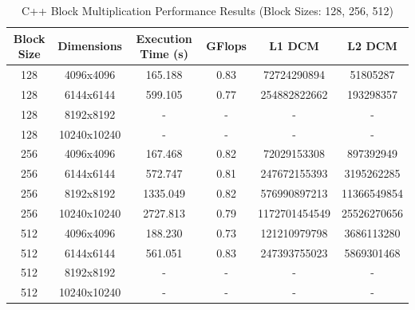 \documentclass{article}
\begin{document}
\begin{table}[H]
\centering
\caption{C++ Block Multiplication Performance Results (Block Sizes: 128, 256, 512)}
\begin{tabular}{||c | c | c | c | c | c||} 
 \hline
 \textbf{Block Size} & \textbf{Dimensions} & \textbf{Execution Time (s)} & \textbf{GFlops} & \textbf{L1 DCM} & \textbf{L2 DCM} \\  
 \hline \hline
 128  & 4096x4096  & 165.188  & 0.83  & 72724290894   & 51805287    \\  
 \hline
 128  & 6144x6144  & 599.105  & 0.77  & 254882822662  & 193298357   \\  
 \hline
 128  & 8192x8192  & -        & -     & -             & -           \\  
 \hline
 128  & 10240x10240 & -       & -     & -             & -           \\  
 \hline \hline
 256  & 4096x4096  & 167.468  & 0.82  & 72029153308   & 897392949   \\  
 \hline
 256  & 6144x6144  & 572.747  & 0.81  & 247672155393  & 3195262285  \\  
 \hline
 256  & 8192x8192  & 1335.049 & 0.82  & 576990897213  & 11366549854 \\  
 \hline
 256  & 10240x10240 & 2727.813 & 0.79  & 1172701454549 & 25526270656 \\  
 \hline \hline
 512  & 4096x4096  & 188.230  & 0.73  & 121210979798  & 3686113280  \\  
 \hline
 512  & 6144x6144  & 561.051  & 0.83  & 247393755023  & 5869301468  \\  
 \hline
 512  & 8192x8192  & -        & -     & -             & -           \\  
 \hline
 512  & 10240x10240 & -       & -     & -             & -           \\  
 \hline
\end{tabular}
\end{table}
\end{document}
